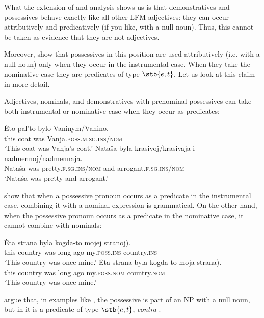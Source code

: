 \documentclass[output=paper,
colorlinks,
citecolor=brown,
newtxmath
]{langscibook}
\begin{document}
What the extension of  and  analysis shows us is that demonstratives and possessives behave exactly like all other LFM adjectives: they can occur attributively and predicatively (if you like, with a null noun). Thus, this cannot be taken as evidence that they are not adjectives. 

Moreover, \citet{Partee.Borschev2003} show that possessives in this position are used attributively (i.e. with a null noun) only when they occur in the instrumental case. When they take the nominative case they are predicates of type $\stb{e,t}$. Let us look at this claim in more detail. 

Adjectives, nominals, and demonstratives with prenominal possessives can take both instrumental or nominative case when they occur as predicates:


\ea
    \ea \gll Ėto pal'to bylo Vaninym/Vanino.\\
    this coat was Vanja.\textsc{poss.m.sg.ins/nom}\\
    \glt `This coat was Vanja's coat.'
    \ex \gll Nataša byla krasivoj/krasivaja i nadmennoj/nadmennaja.\\
    Nataša was pretty.\textsc{f.sg.ins/nom} and arrogant.\textsc{f.sg.ins/nom}\\
    \glt `Nataša was pretty and arrogant.'
\z\z

\noindent \citeauthor{Partee.Borschev2003} show that when a possessive pronoun occurs as a predicate in the instrumental case, combining it with a nominal expression is grammatical. On the other hand, when the possessive pronoun occurs as a predicate in the nominative case, it cannot combine with nominals: 


\ea
    \ea \gll Ėta strana byla kogda-to mojej \minsp{(} stranoj).\label{stranoj}\\
    this country was {long ago} my.\textsc{poss.ins} {} country.\textsc{ins}\\
    \glt `This country was once mine.'
    \ex \gll Ėta strana byla kogda-to moja \minsp{(*} strana).\label{mojastrana}\\
    this country was {long ago} my.\textsc{poss.nom} {} country.\textsc{nom}\\
    \glt `This country was once mine.'
\z\z

    \largerpage[-1]

\noindent \citeauthor{Partee.Borschev2003} argue that, in examples like , the possessive is part of an NP with a null noun, but in  it is a predicate of type $\stb{e,t}$, \textit{contra} \citet{Pereltsvaig2007}.
\end{document}
